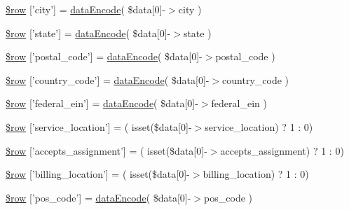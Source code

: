 \begin{DoxyCompactItemize}
\item 
\hyperlink{patientfile_2immnunization_2data__create_8ejs_8php_abc2948b74989328277b5513f9ba22e4e}{\$row} \mbox{[}'city'\mbox{]} = \hyperlink{data_exchange_8class_8php_a18220e6e744fcb46d788ed8b03b85f62}{data\-Encode}( \$data\mbox{[}0\mbox{]}-\/$>$city )
\item 
\hyperlink{patientfile_2immnunization_2data__create_8ejs_8php_a652ce4ee989023692939900810b2a70a}{\$row} \mbox{[}'state'\mbox{]} = \hyperlink{data_exchange_8class_8php_a18220e6e744fcb46d788ed8b03b85f62}{data\-Encode}( \$data\mbox{[}0\mbox{]}-\/$>$state )
\item 
\hyperlink{patientfile_2immnunization_2data__create_8ejs_8php_ad7806756ac25ee8772f6b02f00d601b7}{\$row} \mbox{[}'postal\-\_\-code'\mbox{]} = \hyperlink{data_exchange_8class_8php_a18220e6e744fcb46d788ed8b03b85f62}{data\-Encode}( \$data\mbox{[}0\mbox{]}-\/$>$postal\-\_\-code )
\item 
\hyperlink{patientfile_2immnunization_2data__create_8ejs_8php_a7c5128fc922226763e03d46ff4b7a35e}{\$row} \mbox{[}'country\-\_\-code'\mbox{]} = \hyperlink{data_exchange_8class_8php_a18220e6e744fcb46d788ed8b03b85f62}{data\-Encode}( \$data\mbox{[}0\mbox{]}-\/$>$country\-\_\-code )
\item 
\hyperlink{patientfile_2immnunization_2data__create_8ejs_8php_ab89a458f1e0bf0241b5dbb11f14f56e3}{\$row} \mbox{[}'federal\-\_\-ein'\mbox{]} = \hyperlink{data_exchange_8class_8php_a18220e6e744fcb46d788ed8b03b85f62}{data\-Encode}( \$data\mbox{[}0\mbox{]}-\/$>$federal\-\_\-ein )
\item 
\hyperlink{patientfile_2immnunization_2data__create_8ejs_8php_abb2e5d696b624c8bca263c29503b7350}{\$row} \mbox{[}'service\-\_\-location'\mbox{]} = ( isset(\$data\mbox{[}0\mbox{]}-\/$>$service\-\_\-location) ? 1 \-: 0)
\item 
\hyperlink{patientfile_2immnunization_2data__create_8ejs_8php_a11d3455aa396c9c69454f3e6fad3ec6c}{\$row} \mbox{[}'accepts\-\_\-assignment'\mbox{]} = ( isset(\$data\mbox{[}0\mbox{]}-\/$>$accepts\-\_\-assignment) ? 1 \-: 0)
\item 
\hyperlink{patientfile_2immnunization_2data__create_8ejs_8php_a65028e126c36dd80a9536adb4a71e013}{\$row} \mbox{[}'billing\-\_\-location'\mbox{]} = ( isset(\$data\mbox{[}0\mbox{]}-\/$>$billing\-\_\-location) ? 1 \-: 0)
\item 
\hyperlink{patientfile_2immnunization_2data__create_8ejs_8php_a356c4da2469428341dbff416200baee5}{\$row} \mbox{[}'pos\-\_\-code'\mbox{]} = \hyperlink{data_exchange_8class_8php_a18220e6e744fcb46d788ed8b03b85f62}{data\-Encode}( \$data\mbox{[}0\mbox{]}-\/$>$pos\-\_\-code )

\end{DoxyCompactItemize}
